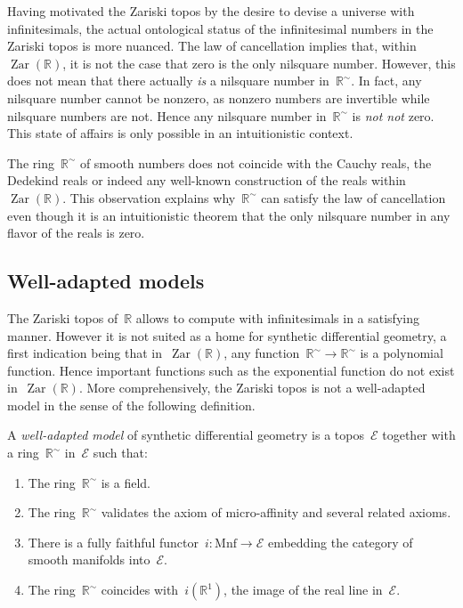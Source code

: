 \documentclass[graybox]{svmult}
\renewcommand{\E}{\mathcal{E}}
\newcommand{\RR}{\mathbb{R}}
\DeclareMathOperator{\Zar}{Zar}
\renewcommand{\_}{\mathpunct{.}\,}
\newcommand{\?}{\,{:}\,}
\begin{document}
Having motivated the Zariski topos by the desire to devise a universe with
infinitesimals, the actual ontological status of the infinitesimal numbers in
the Zariski topos is more nuanced. The law of cancellation implies that,
within~$\Zar(\RR)$, it is not the case that zero is the only nilsquare number.
However, this does not mean that there actually \emph{is} a nilsquare number
in~$\RR^\sim$. In fact, any nilsquare number cannot be nonzero, as nonzero numbers are
invertible while nilsquare numbers are not. Hence any nilsquare number in~$\RR^\sim$
is \emph{not not} zero. This state of affairs is only possible in an
intuitionistic context.

\begin{remark}The ring~$\RR^\sim$ of smooth numbers does not coincide with the Cauchy reals,
the Dedekind reals or indeed any well-known construction of the reals
within~$\Zar(\RR)$. This observation explains why~$\RR^\sim$ can satisfy the law of
cancellation even though it is an intuitionistic theorem that the only
nilsquare number in any flavor of the reals is zero.
\end{remark}


\subsection{Well-adapted models} The Zariski topos of~$\RR$ allows to compute with
infinitesimals in a satisfying manner. However it is not suited as a home for
synthetic differential geometry, a first indication being that in~$\Zar(\RR)$,
any function~$\RR^\sim \to \RR^\sim$ is a polynomial function. Hence important functions such as the
exponential function do not exist in~$\Zar(\RR)$. More comprehensively, the
Zariski topos is not a well-adapted model in the sense of the following
definition.

\begin{definition}\label{defn:well-adapted}A \emph{well-adapted model} of synthetic
differential geometry is a topos~$\E$ together with a ring~$\RR^\sim$ in~$\E$ such
that:
\begin{enumerate}
\item The ring~$\RR^\sim$ is a field.
\item The ring~$\RR^\sim$ validates the axiom of micro-affinity and several related
axioms.
\item There is a fully faithful functor~$i : \mathrm{Mnf} \to \E$ embedding the
category of smooth manifolds into~$\E$.
\item The ring~$\RR^\sim$ coincides with~$i(\RR^1)$, the image of the real line
in~$\E$.
\end{enumerate}
\end{definition}
\end{document}
